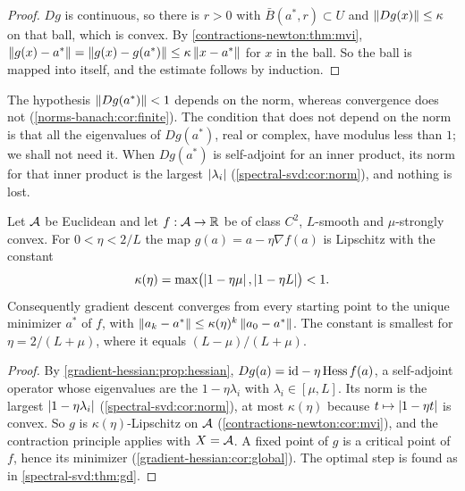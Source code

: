 \begin{notechapter}
\begin{proof}
$Dg$ is continuous, so there is $r > 0$ with $\bar B(a^*, r)\subset U$ and
$\left\|Dg(x)\right\|\leq\kappa$ on that ball, which is convex. By
\cref{contractions-newton:thm:mvi},
$\left\|g(x) - a^*\right\| = \left\|g(x) - g(a^*)\right\|\leq\kappa\left\|x - a^*\right\|$ for
$x$ in the ball. So the ball is mapped into itself, and the estimate
follows by induction.
\end{proof}

\begin{remark}\label{contractions-newton:rem:norm}
The hypothesis $\left\|Dg(a^*)\right\| < 1$ depends on the norm, whereas
convergence does not (\cref{norms-banach:cor:finite}). The condition that
does not depend on the norm is that all the eigenvalues of $Dg(a^*)$,
real or complex, have modulus less than $1$; we shall not need it. When
$Dg(a^*)$ is self-adjoint for an inner product, its norm for that inner
product is the largest $\left|\lambda_i\right|$
(\cref{spectral-svd:cor:norm}), and nothing is lost.
\end{remark}

\begin{theorem}
\label{contractions-newton:thm:gd}
Let $\mathcal{A}$ be Euclidean and let $f:\mathcal{A}\to\mathbb{R}$ be of class $C^2$,
$L$-smooth and $\mu$-strongly convex. For $0 < \eta < 2/L$ the map
$g(a) = a - \eta\nabla f(a)$ is Lipschitz with the constant
\[
  \kappa(\eta) = \max\bigl(\left|1 - \eta\mu\right|, \left|1 - \eta L\right|\bigr) < 1 .
\]
Consequently gradient descent converges from every starting point to the
unique minimizer $a^*$ of $f$, with
$\left\|a_k - a^*\right\|\leq\kappa(\eta)^k\left\|a_0 - a^*\right\|$. The constant is
smallest for $\eta = 2/(L + \mu)$, where it equals
$(L - \mu)/(L + \mu)$.
\end{theorem}

\begin{proof}
By \cref{gradient-hessian:prop:hessian},
$Dg(a) = \mathrm{id} - \eta\operatorname{Hess}f(a)$, a self-adjoint operator
whose eigenvalues are the $1 - \eta\lambda_i$ with
$\lambda_i\in[\mu, L]$. Its norm is the largest $\left|1 - \eta\lambda_i\right|$
(\cref{spectral-svd:cor:norm}), at most $\kappa(\eta)$ because
$t\mapsto\left|1 - \eta t\right|$ is convex. So $g$ is $\kappa(\eta)$-Lipschitz
on $\mathcal{A}$ (\cref{contractions-newton:cor:mvi}), and the contraction
principle applies with $X = \mathcal{A}$. A fixed point of $g$ is a critical
point of $f$, hence its minimizer (\cref{gradient-hessian:cor:global}).
The optimal step is found as in \cref{spectral-svd:thm:gd}.
\end{proof}


\end{notechapter}
